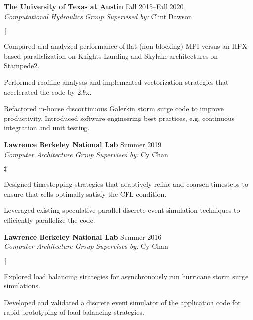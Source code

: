 \documentclass[margin,line]{res}
\newenvironment{list2}{
  \begin{list}{$\ddagger$}{%
      \setlength{\itemsep}{0in}
      \setlength{\parsep}{0in} \setlength{\parskip}{0in}
      \setlength{\topsep}{0in} \setlength{\partopsep}{0in}
      \setlength{\leftmargin}{0.2in}}}{\end{list}}
\begin{document}
\begin{resume}
\textbf{The University of Texas at Austin} \hfill Fall 2015--Fall 2020\\
\textit{Computational Hydraulics Group}
\hfill {\it Supervised by:} Clint Dawson\\
\vspace{-0.1in}
\begin{list2}
\item Compared and analyzed performance of flat (non-blocking) MPI versus an HPX-based parallelization on Knights Landing and Skylake architectures on Stampede2.
\item Performed roofline analyses and implemented vectorization strategies that accelerated the code by 2.9x.
\item Refactored in-house discontinuous Galerkin storm surge code to improve productivity. Introduced software engineering best practices, e.g. continuous integration and unit testing.
\end{list2}

\textbf{Lawrence Berkeley National Lab} \hfill Summer 2019\\
\textit{Computer Architecture Group} \hfill {\it Supervised by:} Cy Chan\\
\vspace{-0.1in}
\begin{list2}
\item Designed timestepping strategies that adaptively refine and coarsen timesteps to ensure that cells optimally satisfy the CFL condition.
\item Leveraged existing speculative parallel discrete event simulation techniques to efficiently parallelize the code.
\end{list2}

\textbf{Lawrence Berkeley National Lab} \hfill Summer 2016\\
\textit{Computer Architecture Group} \hfill {\it Supervised by:} Cy Chan\\
\vspace{-0.1in}
\begin{list2}
\item Explored load balancing strategies for asynchronously run hurricane storm surge simulations.
\item Developed and validated a discrete event simulator of the application code for rapid prototyping of load balancing strategies.
\end{list2}



\end{resume}
\end{document}
